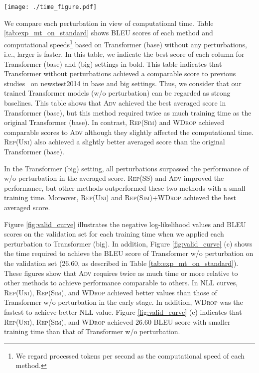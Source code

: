 \documentclass[11pt]{article}
\newcommand{\uniform}{\textsc{Rep(Uni)}}
\newcommand{\parass}{\textsc{Rep(SS)}}
\newcommand{\similarity}{\textsc{Rep(Sim)}}
\newcommand{\worddrop}{\textsc{WDrop}}
\newcommand{\adv}{\textsc{Adv}}
\begin{document}
\begin{figure*}
   \centering 
   \texttt{[image: ./time\_figure.pdf]}
    \caption{Negative log-likelihood (NLL) values, BLEU scores of each method, and time to achieve BLEU score of Transformer w/o perturbation on validation set (newstest2013).}
    \label{fig:valid_curve}
\end{figure*}


We compare each perturbation in view of computational time.
Table \ref{tab:exp_mt_on_standard} shows BLEU scores of each method and computational speeds\footnote{We regard processed tokens per second as the computational speed of each method.} based on Transformer (base) without any perturbations, i.e., larger is faster.
In this table, we indicate the best score of each column for Transformer (base) and (big) settings in bold.
This table indicates that Transformer without perturbations achieved a comparable score to previous studies~\cite{NIPS2017_7181,ott-etal-2018-scaling} on newstest2014 in base and big settings.
Thus, we consider that our trained Transformer models (w/o perturbation) can be regarded as strong baselines.
This table shows that \adv{} achieved the best averaged score in Transformer (base), but this method required twice as much training time as the original Transformer (base).
In contrast, \similarity{} and \worddrop{} achieved comparable scores to \adv{} although they slightly affected the computational time.
\uniform{} also achieved a slightly better averaged score than the original Transformer (base).


In the Transformer (big) setting, all perturbations surpassed the performance of w/o perturbation in the averaged score.
\parass{} and \adv{} improved the performance, but other methods outperformed these two methods with a small training time.
Moreover, \uniform{} and \similarity{}+\worddrop{} achieved the best averaged score.

Figure \ref{fig:valid_curve} illustrates the negative log-likelihood values and BLEU scores on the validation set for each training time when we applied each perturbation to Transformer (big).
In addition, Figure \ref{fig:valid_curve} (c) shows the time required to achieve the BLEU score of Transformer w/o perturbation on the validation set (26.60, as described in Table \ref{tab:exp_mt_on_standard}).
These figures show that \adv{} requires twice as much time or more relative to other methods to achieve performance comparable to others.
In NLL curves, \uniform{}, \similarity{}, and \worddrop{} achieved better values than those of Transformer w/o perturbation in the early stage.
In addition, \worddrop{} was the fastest to achieve better NLL value.
Figure \ref{fig:valid_curve} (c) indicates that \uniform{}, \similarity{}, and \worddrop{} achieved 26.60 BLEU score with smaller training time than that of Transformer w/o perturbation.
\end{document}
